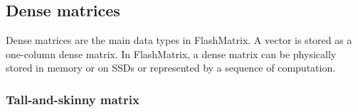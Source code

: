 

\subsection{Dense matrices}
Dense matrices are the main data types in FlashMatrix. A vector is stored
as a one-column dense matrix. In FlashMatrix, a dense matrix can be physically
stored in memory or on SSDs or represented by a sequence of computation.


\subsubsection{Tall-and-skinny matrix} \label{sec:tas_mat}

